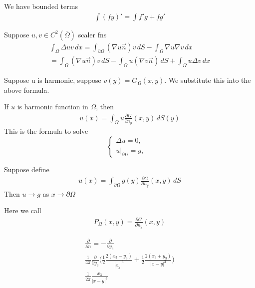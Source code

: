 \documentclass[11pt]{article}
\begin{document}
We have bounded terms
\begin{align*}
    \int(fy)' = \int f'g + fg'
\end{align*}

Suppose $u,v \in C^{2}(\bar{\Omega})$ scaler fns
\begin{align*}
    \int_{\Omega} \Delta u v \, dx = \int_{\partial \Omega}(\nabla u \vec{n})v \,dS 
    - \int_{\Omega} \nabla u \nabla v \, dx\\
    = \int_{\Omega}(\nabla u \vec{n})v \, dS - \int_{\Omega}u(\nabla v \vec{n})\, dS + 
    \int_{\Omega}u \Delta v \, dx
\end{align*}

Suppose u is harmonic, suppose $v(y) = G_{\Omega}(x,y)$. We substitute this into the above formula.

If $u$ is harmonic function in $\Omega$, then 
\begin{align*}
    u(x) = \int_{\Omega}u \frac{\partial G}{\partial n_{y}}(x,y)\, dS(y)
\end{align*}
This is the formula to solve 
\begin{equation}
    \begin{cases} 
    \Delta u = 0, &  \\ 
    u|_{\partial \Omega}= g, &   
    \end{cases}
\end{equation}

\begin{problem}
    Suppose define 
    \begin{align*}
        u(x) = \int_{\partial \Omega}g(y) \frac{\partial G}{\partial n_{y}}(x,y)\, dS 
    \end{align*}
    Then $u \longrightarrow g$ as $x \longrightarrow \partial \Omega$
\end{problem}

Here we call 
\begin{align*}
    P_{\Omega}(x,y) = \frac{\partial G}{\partial n_{y}}(x,y)
\end{align*}

\begin{align*}
    \frac{\partial }{\partial n} = - \frac{\partial }{\partial y_{3}} \\
    \frac{1}{4\pi}\frac{\partial }{\partial y_3}\Big(\frac{1}{2} 
    \frac{2(x_3 - y_3)}{|x_y|^{3}} + \frac{1}{2}\frac{2(x_3 + y_3)}{|x-y|^{3}} \Big)\\
    \frac{1}{2\pi} \frac{x_3}{|x-y|^{3}}
\end{align*}
\end{document}
